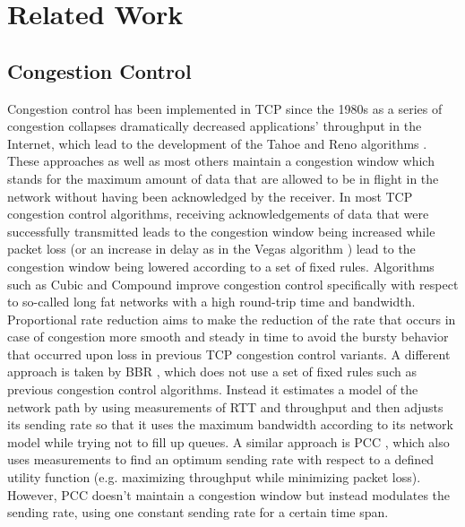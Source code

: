 \documentclass[newfonts=false,format=sigconf,10pt,letterpaper]{acmart}
\begin{document}
\section{Related Work}

\subsection{Congestion Control}

Congestion control has been implemented in TCP since the 1980s as a series of congestion collapses dramatically decreased applications' throughput in the Internet, which lead to the development of the Tahoe and Reno algorithms \cite{jacobson_congestion_1988}. These approaches as well as most others maintain a congestion window which stands for the maximum amount of data that are allowed to be in flight in the network without having been acknowledged by the receiver. In most TCP congestion control algorithms, receiving acknowledgements of data that were successfully transmitted leads to the congestion window being increased while packet loss (or an increase in delay as in the Vegas algorithm \cite{brakmo_tcp_1995}) lead to the congestion window being lowered according to a set of fixed rules. Algorithms such as Cubic and Compound \cite{ha_cubic:_2008, tan_compound_2006} improve congestion control specifically with respect to so-called long fat networks with a high round-trip time and bandwidth. Proportional rate reduction \cite{dukkipati_proportional_2011} aims to make the reduction of the rate that occurs in case of congestion more smooth and steady in time to avoid the bursty behavior that occurred upon loss in previous TCP congestion control variants. A different approach is taken by BBR \cite{cardwell_bbr:_2016}, which does not use a set of fixed rules such as previous congestion control algorithms. Instead it estimates a model of the network path by using measurements of RTT and throughput and then adjusts its sending rate so that it uses the maximum bandwidth according to its network model while trying not to fill up queues. A similar approach is PCC \cite{dong_pcc:_2015}, which also uses measurements to find an optimum sending rate with respect to a defined utility function (e.g. maximizing throughput while minimizing packet loss). However, PCC doesn't maintain a congestion window but instead modulates the sending rate, using one constant sending rate for a certain time span.
\end{document}
